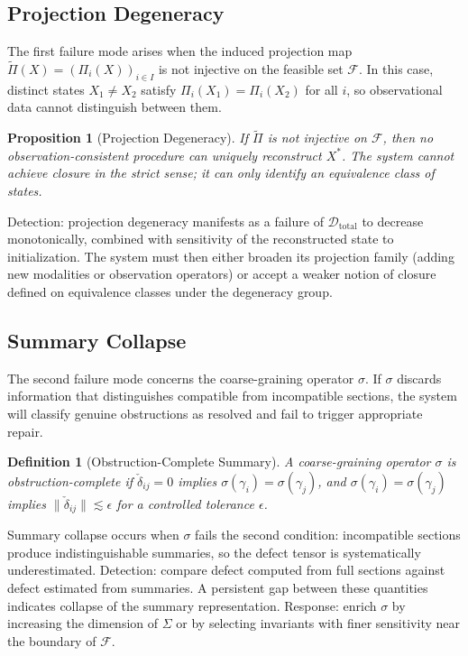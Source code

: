 \documentclass[12pt, oneside]{article}
\newtheorem{definition}{Definition}
\newtheorem{proposition}{Proposition}
\begin{document}
\subsection{Projection Degeneracy}

The first failure mode arises when the induced projection map $\tilde{\Pi}(X) = (\Pi_i(X))_{i \in I}$ is not injective on the feasible set $\mathcal{F}$. In this case, distinct states $X_1 \neq X_2$ satisfy $\Pi_i(X_1) = \Pi_i(X_2)$ for all $i$, so observational data cannot distinguish between them.

\begin{proposition}[Projection Degeneracy]
If $\tilde{\Pi}$ is not injective on $\mathcal{F}$, then no observation-consistent procedure can uniquely reconstruct $X^\ast$. The system cannot achieve closure in the strict sense; it can only identify an equivalence class of states.
\end{proposition}

Detection: projection degeneracy manifests as a failure of $\mathcal{D}_{\text{total}}$ to decrease monotonically, combined with sensitivity of the reconstructed state to initialization. The system must then either broaden its projection family (adding new modalities or observation operators) or accept a weaker notion of closure defined on equivalence classes under the degeneracy group.

\subsection{Summary Collapse}

The second failure mode concerns the coarse-graining operator $\sigma$. If $\sigma$ discards information that distinguishes compatible from incompatible sections, the system will classify genuine obstructions as resolved and fail to trigger appropriate repair.

\begin{definition}[Obstruction-Complete Summary]
A coarse-graining operator $\sigma$ is obstruction-complete if $\check{\delta}_{ij} = 0$ implies $\sigma(\gamma_i) = \sigma(\gamma_j)$, and $\sigma(\gamma_i) = \sigma(\gamma_j)$ implies $\|\check{\delta}_{ij}\| \lesssim \epsilon$ for a controlled tolerance $\epsilon$.
\end{definition}

Summary collapse occurs when $\sigma$ fails the second condition: incompatible sections produce indistinguishable summaries, so the defect tensor is systematically underestimated. Detection: compare defect computed from full sections against defect estimated from summaries. A persistent gap between these quantities indicates collapse of the summary representation. Response: enrich $\sigma$ by increasing the dimension of $\Sigma$ or by selecting invariants with finer sensitivity near the boundary of $\mathcal{F}$.
\end{document}
